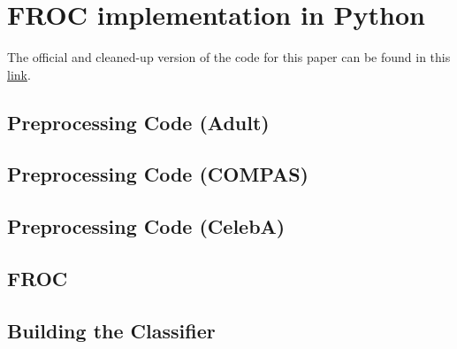 \documentclass{article}
\begin{document}
    






\section{FROC implementation in Python}
The official and cleaned-up version of the code for this paper can be found in this \href{https://github.com/Avyukta-Manjunatha-Vummintala/FROC_code/tree/main}{link}.


\subsection{Preprocessing Code (Adult)}

\subsection{Preprocessing Code (COMPAS)}

\subsection{Preprocessing Code (CelebA)}

\subsection{FROC}

\subsection{Building the Classifier}

\end{document}
